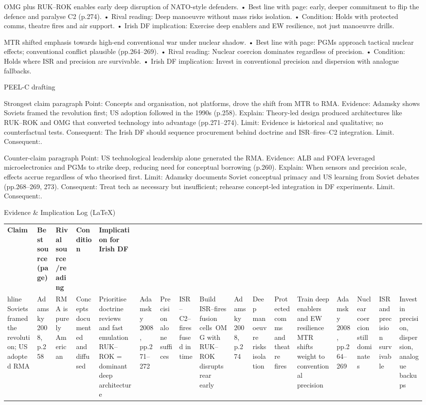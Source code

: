 OMG plus RUK–ROK enables early deep disruption of NATO-style defenders.
• Best line with page: early, deeper commitment to flip the defence and paralyse C2 (p.274).
• Rival reading: Deep manoeuvre without mass risks isolation.
• Condition: Holds with protected comms, theatre fires and air support.
• Irish DF implication: Exercise deep enablers and EW resilience, not just manoeuvre drills.

MTR shifted emphasis towards high-end conventional war under nuclear shadow.
• Best line with page: PGMs approach tactical nuclear effects; conventional conflict plausible (pp.264–269).
• Rival reading: Nuclear coercion dominates regardless of precision.
• Condition: Holds where ISR and precision are survivable.
• Irish DF implication: Invest in conventional precision and dispersion with analogue fallbacks.

PEEL-C drafting

Strongest claim paragraph
Point: Concepts and organisation, not platforms, drove the shift from MTR to RMA.
Evidence: Adamsky shows Soviets framed the revolution first; US adoption followed in the 1990s (p.258).
Explain: Theory-led design produced architectures like RUK–ROK and OMG that converted technology into advantage (pp.271–274).
Limit: Evidence is historical and qualitative; no counterfactual tests.
Consequent: The Irish DF should sequence procurement behind doctrine and ISR–fires–C2 integration. Limit. Consequent:.

Counter-claim paragraph
Point: US technological leadership alone generated the RMA.
Evidence: ALB and FOFA leveraged microelectronics and PGMs to strike deep, reducing need for conceptual borrowing (p.260).
Explain: When sensors and precision scale, effects accrue regardless of who theorised first.
Limit: Adamsky documents Soviet conceptual primacy and US learning from Soviet debates (pp.268–269, 273).
Consequent: Treat tech as necessary but insufficient; rehearse concept-led integration in DF experiments. Limit. Consequent:.

Evidence & Implication Log (LaTeX)

\usepackage{array}
\begin{tabular}{p{3.2cm}p{4.2cm}p{3.6cm}p{3.2cm}p{4.2cm}}
	\textbf{Claim} & \textbf{Best source (page)} & \textbf{Rival source/reading} & \textbf{Condition} & \textbf{Implication for Irish DF}\\hline
	Soviets framed the revolution; US adopted RMA & Adamsky 2008, p.258 & RMA is purely American & Concepts documented and diffused & Prioritise doctrine reviews and fast emulation\
	RUK–ROK = dominant deep architecture & Adamsky 2008, pp.271–272 & Precision alone suffices & ISR–C2–fires fused in time & Build ISR–fires fusion cells\
	OMG with RUK–ROK disrupts rear early & Adamsky 2008, p.274 & Deep manoeuvre risks isolation & Protected comms and theatre fires & Train deep enablers and EW resilience\
	MTR shifts weight to conventional precision & Adamsky 2008, pp.264–269 & Nuclear coercion still dominates & ISR and precision survivable & Invest in precision, dispersion, analogue backups\
\end{tabular}

